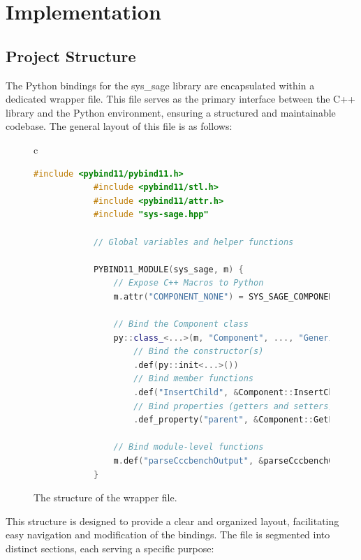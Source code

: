 \chapter{Implementation}\label{chapter:Implementation}

\section{Project Structure}

The Python bindings for the sys\_sage library are encapsulated within a dedicated wrapper file. This file serves as the primary interface between the C++ library and the Python environment, ensuring a structured and maintainable codebase. The general layout of this file is as follows:
\begin{figure}[htpb]
    \centering
    \begin{tabular}{c}
        \begin{lstlisting}[language=C++]
            #include <pybind11/pybind11.h>
            #include <pybind11/stl.h>
            #include <pybind11/attr.h>
            #include "sys-sage.hpp"
            
            // Global variables and helper functions
            
            PYBIND11_MODULE(sys_sage, m) {
                // Expose C++ Macros to Python
                m.attr("COMPONENT_NONE") = SYS_SAGE_COMPONENT_NONE;
            
                // Bind the Component class
                py::class_<...>(m, "Component", ..., "Generic Component")
                    // Bind the constructor(s)
                    .def(py::init<...>())
                    // Bind member functions
                    .def("InsertChild", &Component::InsertChild, ...)
                    // Bind properties (getters and setters)
                    .def_property("parent", &Component::GetParent, &Component::SetParent, ...);
            
                // Bind module-level functions
                m.def("parseCccbenchOutput", &parseCccbenchOutput, ...);
            }
            \end{lstlisting}
    \end{tabular}
    \caption[Structure of the wrapper file]{The structure of the wrapper file.}\label{fig:wrapper-structure}
  \end{figure}


This structure is designed to provide a clear and organized layout, facilitating easy navigation and modification of the bindings. \cite[see The Basics/First Steps]{pybind11-docu} The file is segmented into distinct sections, each serving a specific purpose:

